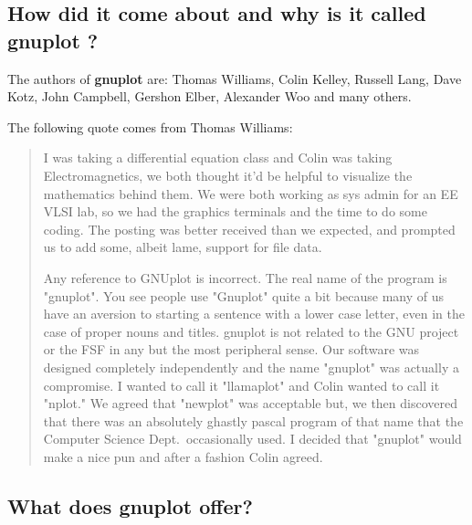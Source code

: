 \documentclass[letter,11pt]{article}
\newcommand{\gnuplot}{\textbf{gnuplot }}
\begin{document}
{\subsection{How did it come about and why is it called \gnuplot?}

The authors of \gnuplot are:
Thomas Williams, Colin Kelley, Russell Lang, Dave Kotz, John
Campbell, Gershon Elber, Alexander Woo and many others.

The following quote comes from Thomas Williams:
\begin{quote}
     I was taking a differential equation class and Colin was taking
     Electromagnetics, we both thought it'd be helpful to visualize the
     mathematics behind them. We were both working as sys admin for an
     EE VLSI lab, so we had the graphics terminals and the time to do
     some coding. The posting was better received than we expected, and
     prompted us to add some, albeit lame, support for file data.

     Any reference to GNUplot is incorrect. The real name of the program
     is "gnuplot". You see people use "Gnuplot" quite a bit because many
     of us have an aversion to starting a sentence with a lower case
     letter, even in the case of proper nouns and titles. gnuplot is not
     related to the GNU project or the FSF in any but the most
     peripheral sense. Our software was designed completely
     independently and the name "gnuplot" was actually a compromise. I
     wanted to call it "llamaplot" and Colin wanted to call it "nplot."
     We agreed that "newplot" was acceptable but, we then discovered
     that there was an absolutely ghastly pascal program of that name
     that the Computer Science Dept.\ occasionally used. I decided that
     "gnuplot" would make a nice pun and after a fashion Colin agreed.
\end{quote}


\subsection{What does \gnuplot offer?}

}
\end{document}
